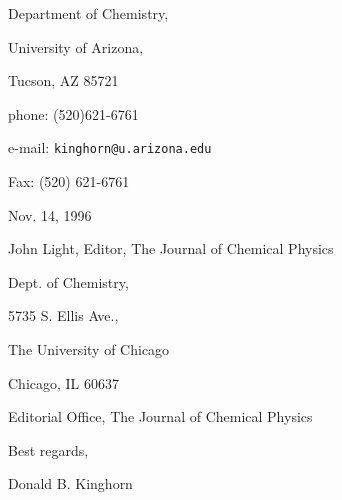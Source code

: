 \documentclass[12pt]{article}
\begin{document}
\begin{letterfrom}
\end{letterfrom}

\begin{letterfromcompany}
\end{letterfromcompany}

\begin{letterfromaddr}
Department of Chemistry,

University of Arizona,

Tucson, AZ 85721\newline

phone: (520)621-6761

e-mail: \texttt{kinghorn@u.arizona.edu}

Fax: (520) 621-6761
\end{letterfromaddr}

\begin{letterdate}
Nov. 14, 1996
\end{letterdate}

\begin{letterto}
\end{letterto}

\begin{lettertoaddr}
John Light, Editor, The Journal of Chemical Physics

Dept. of Chemistry,

5735 S. Ellis Ave.,

The University of Chicago

Chicago, IL 60637
\end{lettertoaddr}

\begin{letterattention}
Editorial Office, The Journal of Chemical Physics
\end{letterattention}

\begin{lettersubj}
\end{lettersubj}

\begin{letterclosing}
Best regards,
\end{letterclosing}

\begin{lettersign}
Donald B. Kinghorn
\end{lettersign}

\begin{letterps}
\end{letterps}

\begin{letterinitials}
\end{letterinitials}
\end{document}

